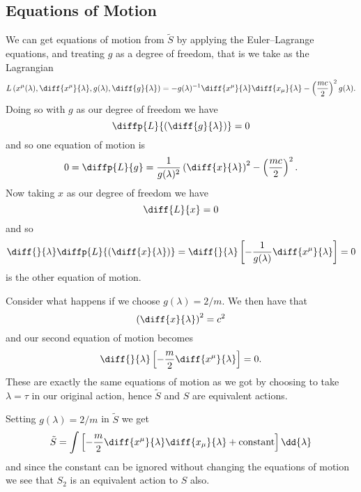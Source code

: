 \documentclass[fleqn]{NotesClass}
\newcommand*{\lagrangian}{L}
\begin{document}
    \subsection{Equations of Motion}
    We can get equations of motion from \(\tilde{S}\) by applying the Euler--Lagrange equations, and treating \(g\) as a degree of freedom, that is we take as the Lagrangian
    \begin{equation}
        \lagrangian\left( x^\mu(\lambda), \diff{x^\mu}{\lambda}, g(\lambda), \diff{g}{\lambda} \right) = -g(\lambda)^{-1} \diff{x^\mu}{\lambda}\diff{x_\mu}{\lambda} - \left( \frac{mc}{2} \right)^2 g(\lambda).
    \end{equation}
    Doing so with \(g\) as our degree of freedom we have
    \begin{equation}
        \diffp{\lagrangian}{\left( \diff{g}{\lambda} \right)} = 0
    \end{equation}
    and so one equation of motion is
    \begin{equation}
        0 = \diffp{\lagrangian}{g} = \frac{1}{g(\lambda)^2} \left( \diff{x}{\lambda} \right)^2 - \left( \frac{mc}{2} \right)^2.
    \end{equation}
    Now taking \(x\) as our degree of freedom we have
    \begin{equation}
        \diff{\lagrangian}{x} = 0
    \end{equation}
    and so
    \begin{equation}
        \diff{}{\lambda}\diffp{\lagrangian}{\left( \diff{x}{\lambda} \right)} = \diff{}{\lambda} \left[ -\frac{1}{g(\lambda)} \diff{x^\mu}{\lambda} \right] = 0
    \end{equation}
    is the other equation of motion.
    
    Consider what happens if we choose \(g(\lambda) = 2/m\).
    We then have that
    \begin{equation}
        \left( \diff{x}{\lambda} \right)^2  = c^2
    \end{equation}
    and our second equation of motion becomes
    \begin{equation}
        \diff{}{\lambda}\left[ -\frac{m}{2} \diff{x^\mu}{\lambda} \right] = 0.
    \end{equation}
    These are exactly the same equations of motion as we got by choosing to take \(\lambda = \tau\) in our original action, hence \(\tilde{S}\) and \(S\) are equivalent actions.
    
    Setting \(g(\lambda) = 2/m\) in \(\tilde{S}\) we get
    \begin{equation}
        \tilde{S} = \int \left[ -\frac{m}{2}\diff{x^\mu}{\lambda}\diff{x_\mu}{\lambda} + \text{constant} \right]\dd{\lambda}
    \end{equation}
    and since the constant can be ignored without changing the equations of motion we see that \(S_2\) is an equivalent action to \(S\) also.
    
\end{document}

